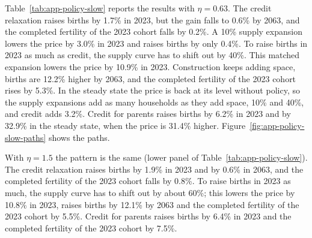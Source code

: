 Table~\ref{tab:app-policy-slow} reports the results with $\eta=0.63$. The credit
relaxation raises births by 1.7\% in 2023, but the gain falls to 0.6\% by 2063,
and the completed fertility of the 2023 cohort falls by 0.2\%. A 10\% supply
expansion lowers the price by 3.0\% in 2023 and raises births by only 0.4\%.
To raise births in 2023 as much as credit, the supply curve has to shift out
by 40\%. This matched expansion lowers the price by 10.9\% in 2023.
Construction keeps adding space, births are 12.2\% higher by 2063, and the
completed fertility of the 2023 cohort rises by 5.3\%. In the steady state the
price is back at its level without policy, so the supply expansions add as
many households as they add space, 10\% and 40\%, and credit adds 3.2\%.
Credit for parents raises births by 6.2\% in 2023 and by 32.9\% in the steady
state, when the price is 31.4\% higher.
Figure~\ref{fig:app-policy-slow-paths} shows the paths.

With $\eta=1.5$ the pattern is the same (lower panel of
Table~\ref{tab:app-policy-slow}). The credit relaxation raises births by 1.9\%
in 2023 and by 0.6\% in 2063, and the completed fertility of the 2023 cohort
falls by 0.8\%. To raise births in 2023 as much, the supply curve has to shift
out by about 60\%; this lowers the price by 10.8\% in 2023, raises births by
12.1\% by 2063 and the completed fertility of the 2023 cohort by 5.5\%.
Credit for parents raises births by 6.4\% in 2023 and the completed fertility
of the 2023 cohort by 7.5\%.

